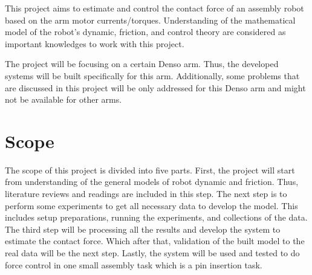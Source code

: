 This project aims to estimate and control the contact force of an assembly robot based on the arm motor currents/torques. Understanding of the mathematical model of the robot’s dynamic, friction, and control theory are considered as important knowledges to work with this project.

The project will be focusing on a certain Denso arm. Thus, the developed systems will be built specifically for this arm. Additionally, some problems that are discussed in this project will be only addressed for this Denso arm and might not be available for other arms.


\section{Scope}


The scope of this project is divided into five parts. First, the project will start from understanding of the general models of robot dynamic and friction. Thus, literature reviews and readings are included in this step. The next step is to perform some experiments to get all necessary data to develop the model. This includes setup preparations, running the experiments, and collections of the data. The third step will be processing all the results and develop the system to estimate the contact force. Which after that, validation of the built model to the real data will be the next step. Lastly, the system will be used and tested to do force control in one small assembly task which is a pin insertion task.
